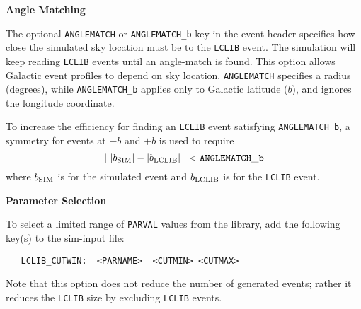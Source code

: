 \documentclass[12pt]{article}
\begin{document}
\newcommand{\bSIM}{b_{\rm SIM}}
\newcommand{\bLCLIB}{b_{\rm LCLIB}}
\bigskip\centerline{\bf Angle Matching}
The optional {\tt ANGLEMATCH} or {\tt ANGLEMATCH\_b} key in the event 
header specifies how close the simulated sky location must be to the 
{\tt LCLIB} event. The simulation will keep reading {\tt LCLIB} events 
until an angle-match is found. This option allows Galactic event
profiles to depend on sky location.
{\tt ANGLEMATCH} specifies a radius (degrees), while  {\tt ANGLEMATCH\_b}
applies only to Galactic latitude ($b$), and ignores the longitude coordinate.

To increase the efficiency for finding an {\tt LCLIB} event satisfying
{\tt ANGLEMATCH\_b}, a symmetry for events at $-b$ and $+b$ 
is used to require
\begin{equation}
     \vert ~ \vert \bSIM \vert - \vert \bLCLIB \vert ~ \vert < 
    {\rm\tt ANGLEMATCH\_b}
\end{equation}
%
where $\bSIM$ is for the simulated event and $\bLCLIB$  
is for the {\tt LCLIB} event.

\bigskip\centerline{\bf Parameter Selection}
To select a limited range of {\tt PARVAL} values from the library,
add the following key(s) to the sim-input file:
\begin{verbatim}
   LCLIB_CUTWIN:  <PARNAME>  <CUTMIN> <CUTMAX>
\end{verbatim}
Note that this option does not reduce the number of generated 
events; rather it reduces the {\tt LCLIB} size by excluding 
{\tt LCLIB} events.
\end{document}
